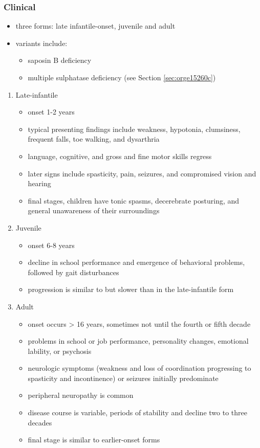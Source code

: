 \documentclass[12pt]{scrartcl}
\begin{document}
\subsubsection{Clinical}
\label{sec:org582f56e}
\begin{itemize}
\item three forms: late infantile-onset, juvenile and adult
\item variants include:
\begin{itemize}
\item saposin B deficiency
\item multiple sulphatase deficiency (see Section \ref{sec:orge15260c})
\end{itemize}
\end{itemize}
\begin{enumerate}
\item Late-infantile
\label{sec:orga5efe7e}
\begin{itemize}
\item onset 1-2 years
\item typical presenting findings include weakness, hypotonia, clumsiness, frequent falls, toe walking, and dysarthria
\item language, cognitive, and gross and fine motor skills regress
\item later signs include spasticity, pain, seizures, and compromised vision and hearing
\item final stages, children have tonic spasms, decerebrate posturing, and
general unawareness of their surroundings
\end{itemize}

\item Juvenile
\label{sec:org701efd2}
\begin{itemize}
\item onset 6-8 years
\item decline in school performance and emergence of behavioral problems, followed by gait disturbances
\item progression is similar to but slower than in the late-infantile form
\end{itemize}

\item Adult
\label{sec:org2bee7d5}
\begin{itemize}
\item onset occurs \textgreater{} 16 years, sometimes not until the fourth or fifth decade
\item problems in school or job performance, personality changes, emotional lability, or psychosis
\item neurologic symptoms (weakness and loss of coordination progressing
to spasticity and incontinence) or seizures initially
predominate
\item peripheral neuropathy is common
\item disease course is variable, periods of stability and decline two to three decades
\item final stage is similar to earlier-onset forms
\end{itemize}
\end{enumerate}
\end{document}
